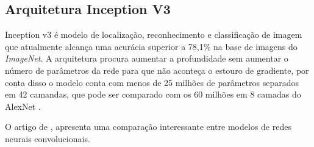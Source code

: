 \subsection{Arquitetura Inception V3}

Inception v3 \cite{szegedy2015going} é modelo de localização, reconhecimento e classificação de imagem que atualmente alcança uma acurácia superior a 78,1\% na base de imagens do \textit{ImageNet}. A arquitetura procura aumentar a profundidade sem aumentar o número de parâmetros da rede para que não aconteça o estouro de gradiente, por conta disso o modelo conta com menos de 25 milhões de parâmetros separados em 42 camandas, que pode ser comparado com os 60 milhões em 8 camadas do AlexNet \cite{alexnetAnalyticsVidhya2021}.


O artigo de , apresenta uma comparação interessante entre modelos de redes neurais convolucionais.